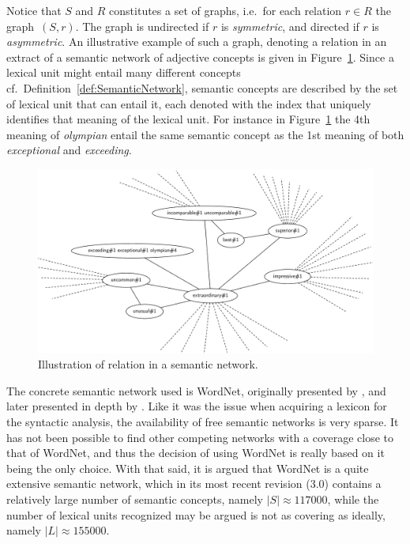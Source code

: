 Notice that $S$ and $R$ constitutes a set of graphs, i.e.\ for each relation $r \in R$ the graph~$(S,r)$. The graph is undirected if $r$ is \emph{symmetric}, and directed if $r$ is \emph{asymmetric}. An illustrative example of such a graph, denoting a relation in an extract of a semantic network of adjective concepts is given in Figure~\ref{fig:semanticNetwork}.  Since a lexical unit might entail many different concepts cf.\ Definition~\ref{def:SemanticNetwork}, semantic concepts are described by the set of lexical unit that can entail it, each denoted with the index that uniquely identifies that meaning of the lexical unit. For instance in Figure~\ref{fig:semanticNetwork} the 4th meaning of \emph{olympian} entail the same semantic concept as the 1st meaning of both \emph{exceptional} and \emph{exceeding}.

\begin{figure}[ht]
  \center
  \includegraphics[scale=.27]{Figures/Exceptional}
  \caption{Illustration of relation in a semantic network.}
  \label{fig:semanticNetwork}
\end{figure}

The concrete semantic network used is WordNet, originally presented by \citeauthor{wordnet} , and later presented in depth by \citeauthor{wordnetBook} . Like it was the issue when acquiring a lexicon for the syntactic analysis, the availability of free semantic networks is very sparse. It has not been possible to find other competing networks with a coverage close to that of WordNet, and thus the decision of using WordNet is really based on it being the only choice. With that said, it is argued that WordNet is a quite extensive semantic network, which in its most recent revision (3.0) contains a relatively large number of semantic concepts, namely $|S| \approx \num{117000}$, while the number of lexical units recognized may be argued is not as covering as ideally, namely $|L| \approx \num{155000}$.

